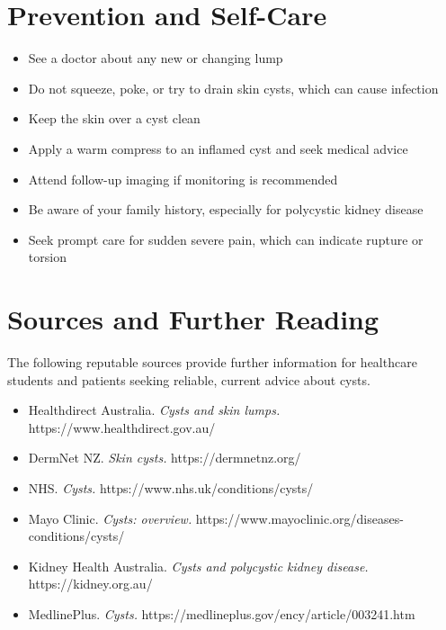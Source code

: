 \section*{Prevention and Self-Care}
\begin{itemize}
    \item See a doctor about any new or changing lump
    \item Do not squeeze, poke, or try to drain skin cysts, which can cause infection
    \item Keep the skin over a cyst clean
    \item Apply a warm compress to an inflamed cyst and seek medical advice
    \item Attend follow-up imaging if monitoring is recommended
    \item Be aware of your family history, especially for polycystic kidney disease
    \item Seek prompt care for sudden severe pain, which can indicate rupture or torsion
\end{itemize}

\section*{Sources and Further Reading}
The following reputable sources provide further information for healthcare students and patients seeking reliable, current advice about cysts.

\begin{itemize}
    \item Healthdirect Australia. \textit{Cysts and skin lumps.} https://www.healthdirect.gov.au/
    \item DermNet NZ. \textit{Skin cysts.} https://dermnetnz.org/
    \item NHS. \textit{Cysts.} https://www.nhs.uk/conditions/cysts/
    \item Mayo Clinic. \textit{Cysts: overview.} https://www.mayoclinic.org/diseases-conditions/cysts/
    \item Kidney Health Australia. \textit{Cysts and polycystic kidney disease.} https://kidney.org.au/
    \item MedlinePlus. \textit{Cysts.} https://medlineplus.gov/ency/article/003241.htm
\end{itemize}
